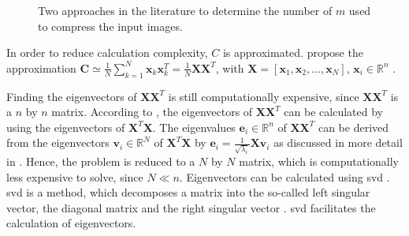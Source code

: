 \begin{figure}%
    \centering
    \qquad
    \caption{Two approaches in the literature to determine the number of \eigenfaces{} $m$ used to compress the input images.}%
    \label{fig:det_n_comp}%
\end{figure}

In order to reduce calculation complexity, $C$ is approximated.
\citeauthor{eigenfaces1997} propose the approximation $\textbf{C} \simeq \frac{1}{N}\sum_{k=1}^{N}\textbf{x}_{k}\textbf{x}_{k}^{T} = \frac{1}{N}\textbf{X}\textbf{X}^{T}$, 
with $\textbf{X} = \left[ \textbf{x}_{1}, \textbf{x}_{2}, ..., \textbf{x}_{N} \right]$, $\textbf{x}_i \in \mathbb{R}^{n}$ \cite{eigenfaces1997}.

Finding the eigenvectors of $\textbf{X}\textbf{X}^{T}$ is still computationally expensive, since $\textbf{X}\textbf{X}^{T}$ is a $n$ by $n$ matrix.
According to \citeauthor{eigenfaces1997}, the eigenvectors of $\textbf{X}\textbf{X}^{T}$ can be calculated by using the eigenvectors of $\textbf{X}^{T}\textbf{X}$.
The eigenvalues $\textbf{e}_i \in \mathbb{R}^{n}$ of $\textbf{X}\textbf{X}^{T}$ can be derived from the eigenvectors $\textbf{v}_i \in \mathbb{R}^{N}$ of $\textbf{X}^{T}\textbf{X}$ by 
$\textbf{e}_i = \frac{1}{\sqrt{\lambda_i}}\textbf{X}\textbf{v}_i$ as discussed in more detail in \cite{eigenfaces1997}.
Hence, the problem is reduced to a $N$ by $N$ matrix, which is computationally less expensive to solve, since $N \ll n$.
Eigenvectors can be calculated using \ac{svd} \cite{eigenfaces1997}.
\ac{svd} is a method, which decomposes a matrix into the so-called left singular vector, the diagonal matrix and the right singular vector \cite{dim_reduction2021}. 
\ac{svd} facilitates the calculation of eigenvectors.

